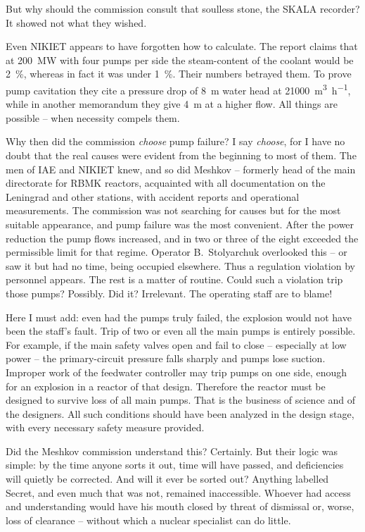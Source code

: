 \documentclass[openright]{bookest}
\begin{document}
But why should the commission consult that soulless stone, the SKALA recorder? It showed not what they wished.

Even NIKIET appears to have forgotten how to calculate. The report claims that at \qty{200}{\mega\watt} with four pumps per side the steam-content of the coolant would be \qty{2}{\percent}, whereas in fact it was under \qty{1}{\percent}. Their numbers betrayed them. To prove pump cavitation they cite a pressure drop of \qty{8}{\metre} water head at \qty{21000}{\metre\cubed\per\hour}, while in another memorandum they give \qty{4}{\metre} at a higher flow. All things are possible -- when necessity compels them.

Why then did the commission \textit{choose} pump failure? I say \textit{choose}, for I have no doubt that the real causes were evident from the beginning to most of them. The men of IAE and NIKIET knew, and so did Meshkov -- formerly head of the main directorate for RBMK reactors, acquainted with all documentation on the Leningrad and other stations, with accident reports and operational measurements. The commission was not searching for causes but for the most suitable appearance, and pump failure was the most convenient. After the power reduction the pump flows increased, and in two or three of the eight exceeded the permissible limit for that regime. Operator B.~Stolyarchuk overlooked this -- or saw it but had no time, being occupied elsewhere. Thus a regulation violation by personnel appears. The rest is a matter of routine. Could such a violation trip those pumps? Possibly. Did it? Irrelevant. The operating staff are to blame!

Here I must add: even had the pumps truly failed, the explosion would not have been the staff's fault. Trip of two or even all the main pumps is entirely possible. For example, if the main safety valves open and fail to close -- especially at low power -- the primary-circuit pressure falls sharply and pumps lose suction. Improper work of the feedwater controller may trip pumps on one side, enough for an explosion in a reactor of that design. Therefore the reactor must be designed to survive loss of all main pumps. That is the business of science and of the designers. All such conditions should have been analyzed in the design stage, with every necessary safety measure provided.

Did the Meshkov commission understand this? Certainly. But their logic was simple: by the time anyone sorts it out, time will have passed, and deficiencies will quietly be corrected. And will it ever be sorted out? Anything labelled Secret, and even much that was not, remained inaccessible. Whoever had access and understanding would have his mouth closed by threat of dismissal or, worse, loss of clearance -- without which a nuclear specialist can do little.
\end{document}
